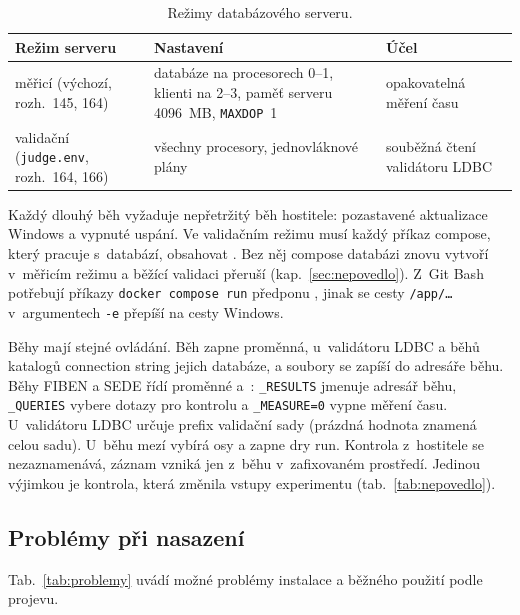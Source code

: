 \begin{table}[H]
\centering\footnotesize
\begin{tabularx}{\textwidth}{L{4.9cm} Y L{4.8cm}}
\toprule
\textbf{Režim serveru} & \textbf{Nastavení} & \textbf{Účel} \\
\midrule
měřicí (výchozí, rozh.~145, 164) & databáze na procesorech 0--1, klienti na 2--3, paměť serveru 4096~MB, \texttt{MAXDOP}~1 & opakovatelná měření času \\
validační (\texttt{judge.env}, rozh.~164, 166) & všechny procesory, jednovláknové plány & souběžná čtení validátoru LDBC \\
\bottomrule
\end{tabularx}%
\caption{Režimy databázového serveru.}
\label{tab:rezimy}
\end{table}

Každý dlouhý běh vyžaduje nepřetržitý běh hostitele: pozastavené aktualizace Windows a vypnuté uspání. Ve validačním režimu musí každý příkaz compose, který pracuje s~databází, obsahovat . Bez něj compose databázi znovu vytvoří v~měřicím režimu a běžící validaci přeruší (kap.~\ref{sec:nepovedlo}). Z~Git Bash potřebují příkazy \texttt{docker compose run} předponu , jinak se cesty \texttt{/app/\ldots} v~argumentech \texttt{-e} přepíší na cesty Windows.

Běhy mají stejné ovládání. Běh zapne proměnná, u~validátoru LDBC a běhů katalogů connection string jejich databáze, a soubory se zapíší do adresáře běhu. Běhy FIBEN a SEDE řídí proměnné  a~: \texttt{\_RESULTS} jmenuje adresář běhu, \texttt{\_QUERIES} vybere dotazy pro kontrolu a \texttt{\_MEASURE=0} vypne měření času. U~validátoru LDBC určuje  prefix validační sady (prázdná hodnota znamená celou sadu). U~běhu mezí vybírá  osy a  zapne dry run. Kontrola z~hostitele se nezaznamenává, záznam vzniká jen z~běhu v~zafixovaném prostředí. Jedinou výjimkou je kontrola, která změnila vstupy experimentu (tab.~\ref{tab:nepovedlo}).

\subsection{Problémy při nasazení}\label{sec:problemy}

Tab.~\ref{tab:problemy} uvádí možné problémy instalace a běžného použití podle projevu.

